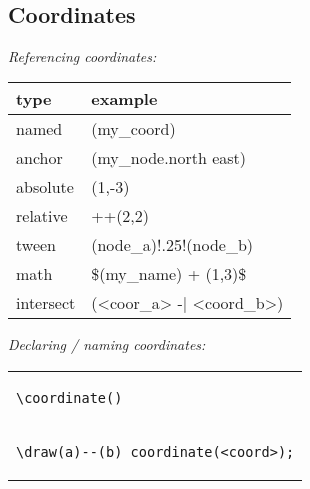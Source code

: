 \ \\

\subsection*{Coordinates}
\textit{Referencing coordinates:} \\
\begin{tabularx}{4cm}{l l}
    type & example \\
    \hline 
    named & (my\_coord) \\
    anchor & (my\_node.north east) \\
    absolute & (1,-3) \\
    relative & ++(2,2) \\
    tween & (node\_a)!.25!(node\_b) \\
    math & \$(my\_name) + (1,3)\$ \\
    intersect & (<coor\_a> -| <coord\_b>)
\end{tabularx}

\textit{Declaring / naming coordinates: } \\
\begin{tabular}{l}
\begin{lstlisting}
\coordinate()
\end{lstlisting} \\
\begin{lstlisting}
\draw(a)--(b) coordinate(<coord>);
\end{lstlisting} \\
\end{tabular}


\ \\